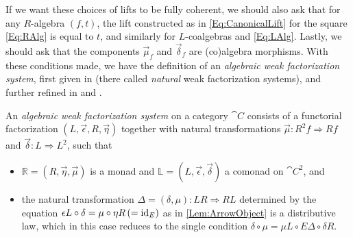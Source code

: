 If we want these choices of lifts to be fully coherent, we should also ask that for any $R$-algebra $(f,t)$, the lift constructed as in \eqref{Eq:CanonicalLift} for the square \eqref{Eq:RAlg} is equal to $t$, and similarly for $L$-coalgebras and \eqref{Eq:LAlg}. Lastly, we should ask that the components $\vec{\mu}_f$ and $\vec{\delta}_f$ are (co)algebra morphisms. With these conditions made, we have the definition of an \emph{algebraic weak factorization system}, first given in \cite{gt:nwfs} (there called \emph{natural} weak factorization systems), and further refined in \cite{garner:nwfs} and \cite{garner:soa}.

\begin{definition}\label{Def:Awfs}
	An \emph{algebraic weak factorization system} on a category $\cat{C}$ consists of a functorial factorization $(L,\vec{\epsilon},R,\vec{\eta})$ together with natural transformations $\vec{\mu}\colon R^2f\Rightarrow Rf$ and $\vec{\delta}\colon L\Rightarrow L^2$, such that
	\begin{itemize}
		\item $\mathbb{R}=(R,\vec{\eta},\vec{\mu})$ is a monad and $\mathbb{L}=(L,\vec{\epsilon},\vec{\delta})$ a comonad on $\cat{C}^2$, and
		\item the natural transformation $\Delta=(\delta,\mu)\colon LR\Rightarrow RL$ determined by the equation $\epsilon L\circ\delta=\mu\circ\eta R \, (=\operatorname{id}_E)$ as in \ref{Lem:ArrowObject} is a distributive law, which in this case reduces to the single condition $\delta\circ\mu = \mu L\circ E\Delta\circ\delta R$.
	\end{itemize}
\end{definition}